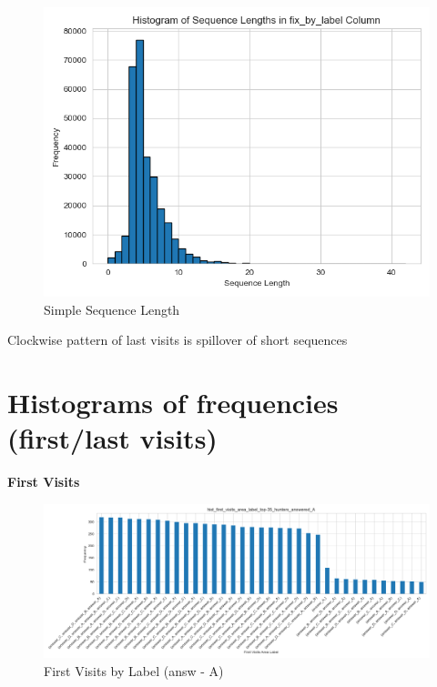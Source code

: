 \documentclass{article}
\begin{document}
\begin{figure}[H]
    \centering
    \includegraphics[width=1\linewidth]{plots/sequence_freq/simpl_fix_by_label.png}
    \caption{Simple Sequence Length}
    \label{fig:length}
\end{figure}
Clockwise pattern of last visits is spillover of short sequences 



\newpage
\section{Histograms of frequencies (first/last visits)}


\textbf{First Visits}
\begin{figure}[H]
    \centering
    \includegraphics[width=1\linewidth]{plots/visits_hists/hist_first_visits_area_label_top-35_hunters_answered_A.png}
    \caption{First Visits by Label (answ - A)}
    \label{fig:sl_h}
\end{figure}
\end{document}
